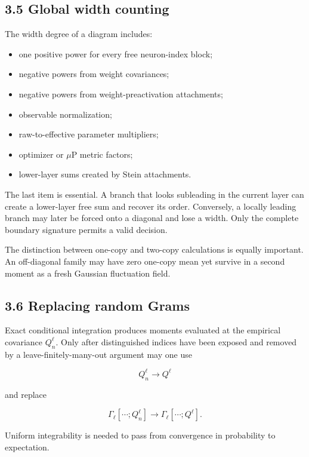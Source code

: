 \subsection*{3.5 Global width counting}


The width degree of a diagram includes:

\begin{itemize}
\item one positive power for every free neuron-index block;
\item negative powers from weight covariances;
\item negative powers from weight-preactivation attachments;
\item observable normalization;
\item raw-to-effective parameter multipliers;
\item optimizer or \(\mu\)P metric factors;
\item lower-layer sums created by Stein attachments.
\end{itemize}


The last item is essential. A branch that looks subleading in the current
layer can create a lower-layer free sum and recover its order. Conversely, a
locally leading branch may later be forced onto a diagonal and lose a width.
Only the complete boundary signature permits a valid decision.

The distinction between one-copy and two-copy calculations is equally
important. An off-diagonal family may have zero one-copy mean yet survive in a
second moment as a fresh Gaussian fluctuation field.

\subsection*{3.6 Replacing random Grams}


Exact conditional integration produces moments evaluated at the empirical
covariance \(Q_n^\ell\). Only after distinguished indices have been exposed
and removed by a leave-finitely-many-out argument may one use

\[
Q_n^\ell\longrightarrow Q^\ell
\]


and replace

\[
\Gamma_\ell[\cdots;Q_n^\ell]
\longrightarrow
\Gamma_\ell[\cdots;Q^\ell].
\]


Uniform integrability is needed to pass from convergence in probability to
expectation.

